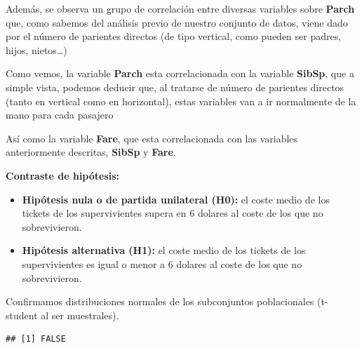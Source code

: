 \documentclass[]{article}
\newenvironment{Shaded}{\begin{snugshade}}{\end{snugshade}}
\newcommand{\DecValTok}[1]{\textcolor[rgb]{0.00,0.00,0.81}{#1}}
\newcommand{\FloatTok}[1]{\textcolor[rgb]{0.00,0.00,0.81}{#1}}
\newcommand{\KeywordTok}[1]{\textcolor[rgb]{0.13,0.29,0.53}{\textbf{#1}}}
\newcommand{\NormalTok}[1]{#1}
\newcommand{\OperatorTok}[1]{\textcolor[rgb]{0.81,0.36,0.00}{\textbf{#1}}}
\newcommand{\StringTok}[1]{\textcolor[rgb]{0.31,0.60,0.02}{#1}}
\begin{document}
Además, se observa un grupo de correlación entre diversas variables
sobre \textbf{Parch} que, como sabemos del análisis previo de nuestro
conjunto de datos, viene dado por el número de parientes directos (de
tipo vertical, como pueden ser padres, hijos, nietos\ldots{})

Como vemos, la variable \textbf{Parch} esta correlacionada con la
variable \textbf{SibSp}, que a simple vista, podemos deducir que, al
tratarse de número de parientes directos (tanto en vertical como en
horizontal), estas variables van a ir normalmente de la mano para cada
pasajero

Así como la variable \textbf{Fare}, que esta correlacionada con las
variables anteriormente descritas, \textbf{SibSp} y \textbf{Fare}.

\textbf{Contraste de hipótesis:}

\begin{itemize}
\item
  \textbf{Hipótesis nula o de partida unilateral (H0):} el coste medio
  de los tickets de los supervivientes supera en 6 dolares al coste de
  los que no sobrevivieron.
\item
  \textbf{Hipótesis alternativa (H1):} el coste medio de los tickets de
  los supervivientes es igual o menor a 6 dolares al coste de los que no
  sobrevivieron.
\end{itemize}

Confirmamos distribuciones normales de los subconjuntos poblacionales
(t-student al ser muestrales).

\begin{Shaded}
\end{Shaded}

\begin{verbatim}
## [1] FALSE
\end{verbatim}

\begin{Shaded}
\end{Shaded}
\end{document}
